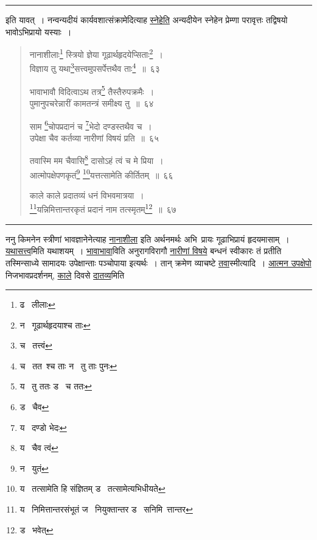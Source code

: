\documentclass[11pt, openany]{book}
\begin{document}
\hrule

\vspace{2mm}
\noindent
इति यावत्~। नन्वन्यदीयं कार्यवशात्संक्रामेदित्याह \underline{स्नेहेति} अन्यदीयेन स्नेहेन प्रेम्णा परावृत्तः तद्विषयो भावोऽभिप्रायो यस्याः~।

\newpage

\begin{quote}
{\na नानाशीलाः\renewcommand{\thefootnote}{1}\footnote{ढ \textendash\  लीलाः} स्त्रियो ज्ञेया गूढार्थहृदयेप्सिताः\renewcommand{\thefootnote}{2}\footnote{न \textendash\  गूढार्थहृदयाश्च ताः}~।\\
विज्ञाय तु यथा\renewcommand{\thefootnote}{3}\footnote{च \textendash\  तत्त्वं}सत्त्वमुपसर्पेत्तथैव ताः\renewcommand{\thefootnote}{4}\footnote{च \textendash\  तत\textendash\ श्च ताः न \textendash\  तु ताः पुनः}~॥~६३

भावाभावौ विदित्वाऽथ तत्र\renewcommand{\thefootnote}{5}\footnote{य \textendash\  तु ततः ड \textendash\  च ततः} तैस्तैरुपक्रमैः~।\\
पुमानुपचरेन्नारीं कामतन्त्रं समीक्ष्य तु~॥~६४

साम \renewcommand{\thefootnote}{6}\footnote{ड \textendash\  चैव}चोपप्रदानं च \renewcommand{\thefootnote}{7}\footnote{य \textendash\  दण्डो भेदः}भेदो दण्डस्तथैव च~।\\
उपेक्षा चैव कर्तव्या नारीणां विषयं प्रति~॥~६५

तवास्मि मम चैवासि\renewcommand{\thefootnote}{8}\footnote{य \textendash\  चैव त्वं} दासोऽहं त्वं च मे प्रिया~।\\
आत्मोपक्षेपणकृतं\renewcommand{\thefootnote}{9}\footnote{न \textendash\  युतं} \renewcommand{\thefootnote}{10}\footnote{य \textendash\  तत्सामेति हि संज्ञितम् ड \textendash\  तत्सामेत्यभिधीयते}यत्तत्सामेति कीर्तितम्~॥~६६

काले काले प्रदातव्यं धनं विभवमात्रया~।\\
\renewcommand{\thefootnote}{11}\footnote{य \textendash\  निमित्तान्तरसंभूतं ज \textendash\  नियुक्तान्तर ड \textendash\  सनिमि\textendash\ त्तान्तर}यन्निमित्तान्तरकृतं प्रदानं नाम तत्स्मृतम्\renewcommand{\thefootnote}{12}\footnote{ड \textendash\  भवेत्}~॥~६७}
\end{quote}

\hrule

\vspace{2mm}
ननु किमनेन स्त्रीणां भावज्ञानेनेत्याह \underline{नानाशीला} इति अर्थनमर्थः अभि\textendash\ प्रायः गूढाभिप्रायं हृदयमासाम्~। \underline{यथासत्त्व}मिति यथाशयम्~। \underline{भावाभावा}विति अनुरागविरागौ \underline{नारीणां विषये} बन्धनं स्वीकारः तं प्रतीति तस्मिन्साध्ये सामादयः उपेक्षान्ताः पञ्चोपाया इत्यर्थः~। तान् क्रमेण व्याचष्टे \underline{तवा}स्मीत्यादि~। \underline{आत्मन उपक्षेपो} निजभावप्रदर्शनम्, \underline{काले} दिवसे \underline{दातव्य}मिति 
\end{document}

